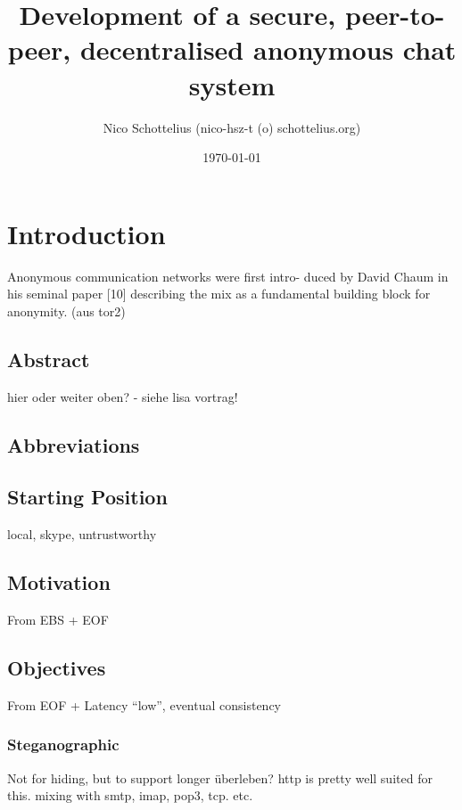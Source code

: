 \documentclass[12pt,a4paper]{article}
\begin{document}
\title{Development of a secure, peer-to-peer, decentralised anonymous chat system}
\date{\today}
\author{Nico Schottelius (nico-hsz-t (o) schottelius.org)}
\maketitle
\newpage
\tableofcontents
\listoftables
\newpage

\section{Introduction}

Anonymous communication networks were first intro-
duced by David Chaum in his seminal paper [10] describing
the mix as a fundamental building block for anonymity.
(aus tor2)

\subsection{Abstract}
hier oder weiter oben? - siehe lisa vortrag!

\subsection{Abbreviations}
\subsection{Starting Position}
local, skype, untrustworthy

\subsection{Motivation}
From EBS + EOF

\subsection{Objectives}
From EOF + Latency "`low"', eventual consistency
\subsubsection{Steganographic}
Not for hiding, but to support longer überleben?
http is pretty well suited for this.
mixing with smtp, imap, pop3, tcp. etc.
\end{document}
